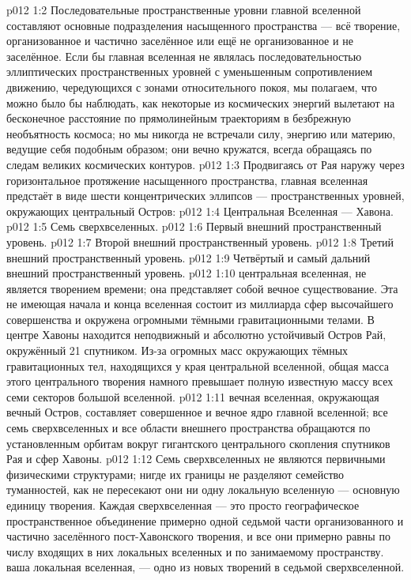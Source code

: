 \vs p012 1:2 Последовательные пространственные уровни главной вселенной составляют основные подразделения насыщенного пространства --- всё творение, организованное и частично заселённое или ещё не организованное и не заселённое. Если бы главная вселенная не являлась последовательностью эллиптических пространственных уровней с уменьшенным сопротивлением движению, чередующихся с зонами относительного покоя, мы полагаем, что можно было бы наблюдать, как некоторые из космических энергий вылетают на бесконечное расстояние по прямолинейным траекториям в безбрежную необъятность космоса; но мы никогда не встречали силу, энергию или материю, ведущие себя подобным образом; они вечно кружатся, всегда обращаясь по следам великих космических контуров.
\vs p012 1:3 \pc Продвигаясь от Рая наружу через горизонтальное протяжение насыщенного пространства, главная вселенная предстаёт в виде шести концентрических эллипсов --- пространственных уровней, окружающих центральный Остров:
\vs p012 1:4 Центральная Вселенная --- Хавона.
\vs p012 1:5 Семь сверхвселенных.
\vs p012 1:6 Первый внешний пространственный уровень.
\vs p012 1:7 Второй внешний пространственный уровень.
\vs p012 1:8 Третий внешний пространственный уровень.
\vs p012 1:9 Четвёртый и самый дальний внешний пространственный уровень.
\vs p012 1:10 \pc {} центральная вселенная, не является творением времени; она представляет собой вечное существование. Эта не имеющая начала и конца вселенная состоит из миллиарда сфер высочайшего совершенства и окружена огромными тёмными гравитационными телами. В центре Хавоны находится неподвижный и абсолютно устойчивый Остров Рай, окружённый 21 спутником. Из\hyp{}за огромных масс окружающих тёмных гравитационных тел, находящихся у края центральной вселенной, общая масса этого центрального творения намного превышает полную известную массу всех семи секторов большой вселенной.
\vs p012 1:11 \pc {} вечная вселенная, окружающая вечный Остров, составляет совершенное и вечное ядро главной вселенной; все семь сверхвселенных и все области внешнего пространства обращаются по установленным орбитам вокруг гигантского центрального скопления спутников Рая и сфер Хавоны.
\vs p012 1:12 Семь сверхвселенных не являются первичными физическими структурами; нигде их границы не разделяют семейство туманностей, как не пересекают они ни одну локальную вселенную --- основную единицу творения. Каждая сверхвселенная --- это просто географическое пространственное объединение примерно одной седьмой части организованного и частично заселённого пост\hyp{}Хавонского творения, и все они примерно равны по числу входящих в них локальных вселенных и по занимаемому пространству.  ваша локальная вселенная, --- одно из новых творений в  седьмой сверхвселенной.
